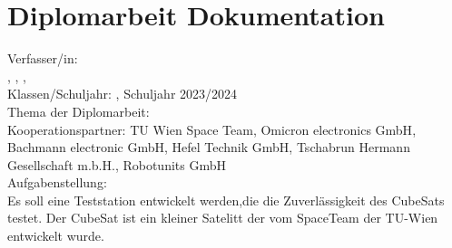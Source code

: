 

\section{Diplomarbeit Dokumentation}
\vspace{3mm}
 Verfasser/in:\\
\nameSH, \nameJS, \nameCZ, \nameSB\\ 
\vspace{3mm}
Klassen/Schuljahr: \klasse, Schuljahr 2023/2024\\
\vspace{3mm}
Thema der Diplomarbeit: \Thema\\
\vspace{3mm}
Kooperationspartner: TU Wien Space Team\autocite{TU_Wien_Spaceteam}, Omicron electronics GmbH\autocite{OMICRON_electronics_GmbH}, Bachmann electronic GmbH\autocite{Bachmann_electronic_GmbH}, Hefel Technik GmbH\autocite{Hefel_Technik_GmbH}, Tschabrun Hermann Gesellschaft m.b.H.\autocite{Tschabrun_Hermann_Gesellschaft}, Robotunits GmbH\autocite{robogmbh} \\
\vspace{3mm}
Aufgabenstellung:\\
Es soll eine Teststation entwickelt werden,die die Zuverlässigkeit des CubeSats testet. Der CubeSat ist ein kleiner Satelitt der vom SpaceTeam der TU-Wien entwickelt wurde.\\    

